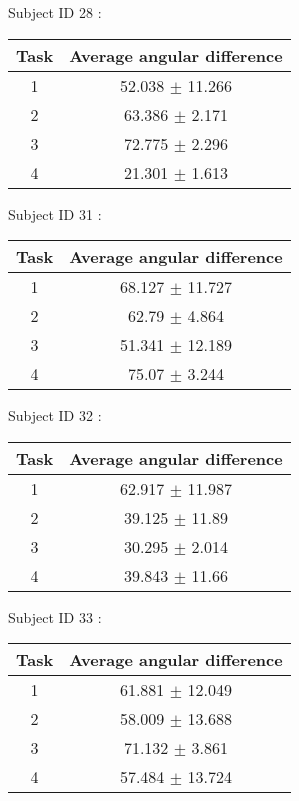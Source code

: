 \documentclass[12pt]{article}
\begin{document}
\par Subject ID  28 :
\begin{center}
\begin{tabular}{|c|c|}
\hline
 Task & Average angular difference \\ \hline
1  &  52.038 $\pm$ 11.266 \\
2  &  63.386 $\pm$ 2.171 \\
3  &  72.775 $\pm$ 2.296 \\
4  &  21.301 $\pm$ 1.613 \\
\hline
\end{tabular}
\end{center}

\par Subject ID  31 :
\begin{center}
\begin{tabular}{|c|c|}
\hline
 Task & Average angular difference \\ \hline
1  &  68.127 $\pm$ 11.727 \\
2  &  62.79 $\pm$ 4.864 \\
3  &  51.341 $\pm$ 12.189 \\
4  &  75.07 $\pm$ 3.244 \\
\hline
\end{tabular}
\end{center}

\par Subject ID  32 :
\begin{center}
\begin{tabular}{|c|c|}
\hline
 Task & Average angular difference \\ \hline
1  &  62.917 $\pm$ 11.987 \\
2  &  39.125 $\pm$ 11.89 \\
3  &  30.295 $\pm$ 2.014 \\
4  &  39.843 $\pm$ 11.66 \\
\hline
\end{tabular}
\end{center}

\par Subject ID  33 :
\begin{center}
\begin{tabular}{|c|c|}
\hline
 Task & Average angular difference \\ \hline
1  &  61.881 $\pm$ 12.049 \\
2  &  58.009 $\pm$ 13.688 \\
3  &  71.132 $\pm$ 3.861 \\
4  &  57.484 $\pm$ 13.724 \\
\hline
\end{tabular}
\end{center}
\end{document}
